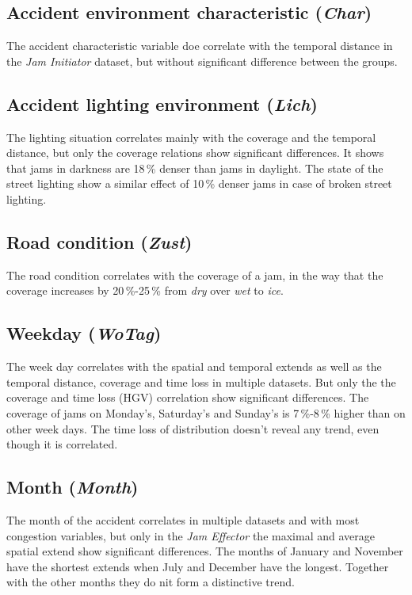 \subsection{Accident environment characteristic (\textit{Char})}
The accident characteristic variable doe correlate with the temporal distance in the \textit{Jam Initiator} dataset, but without significant difference between the groups.

\subsection{Accident lighting environment (\textit{Lich})}
The lighting situation correlates mainly with the coverage and the temporal distance, but only the coverage relations show significant differences. It shows that jams in darkness are 18\,\% denser than jams in daylight. The state of the street lighting show a similar effect of 10\,\% denser jams in case of broken street lighting.

\subsection{Road condition (\textit{Zust})}
The road condition correlates with the coverage of a jam, in the way that the coverage increases by 20\,\%-25\,\% from \textit{dry} over \textit{wet} to \textit{ice}.

\subsection{Weekday (\textit{WoTag})}
The week day correlates with the spatial and temporal extends as well as the temporal distance, coverage and time loss in multiple datasets. But only the the coverage and time loss (HGV) correlation show significant differences. The coverage of jams on Monday's, Saturday's and Sunday's is 7\,\%-8\,\% higher than on other week days. The time loss of distribution doesn't reveal any trend, even though it is correlated.

\subsection{Month (\textit{Month})}
The month of the accident correlates in multiple datasets and with most congestion variables, but only in the \textit{Jam Effector} the maximal and average spatial extend show significant differences. The months of January and November have the shortest extends when July and December have the longest. Together with the other months they do nit form a distinctive trend. 


